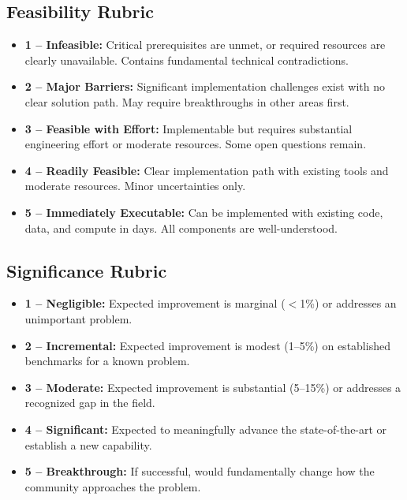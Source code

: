 \subsection{Feasibility Rubric}
\begin{itemize}[leftmargin=*]
\item \textbf{1 -- Infeasible:} Critical prerequisites are unmet, or required resources are clearly unavailable. Contains fundamental technical contradictions.
\item \textbf{2 -- Major Barriers:} Significant implementation challenges exist with no clear solution path. May require breakthroughs in other areas first.
\item \textbf{3 -- Feasible with Effort:} Implementable but requires substantial engineering effort or moderate resources. Some open questions remain.
\item \textbf{4 -- Readily Feasible:} Clear implementation path with existing tools and moderate resources. Minor uncertainties only.
\item \textbf{5 -- Immediately Executable:} Can be implemented with existing code, data, and compute in days. All components are well-understood.
\end{itemize}

\subsection{Significance Rubric}
\begin{itemize}[leftmargin=*]
\item \textbf{1 -- Negligible:} Expected improvement is marginal ($<$1\%) or addresses an unimportant problem.
\item \textbf{2 -- Incremental:} Expected improvement is modest (1--5\%) on established benchmarks for a known problem.
\item \textbf{3 -- Moderate:} Expected improvement is substantial (5--15\%) or addresses a recognized gap in the field.
\item \textbf{4 -- Significant:} Expected to meaningfully advance the state-of-the-art or establish a new capability.
\item \textbf{5 -- Breakthrough:} If successful, would fundamentally change how the community approaches the problem.
\end{itemize}

